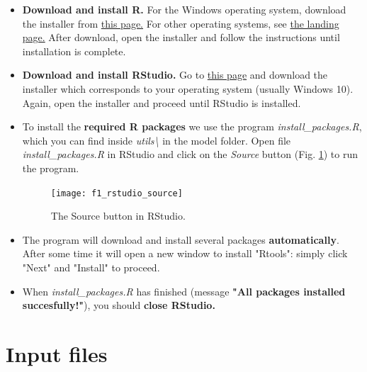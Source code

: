 \documentclass[15pt]{extarticle}
\begin{document}
\begin{itemize}
    \item \textbf{Download and install R.} For the Windows operating system, download the installer from \href{https://cran.rstudio.com/bin/windows/base/}{this page.} For other operating systems, see \href{https://cran.rstudio.com/}{the landing page.} After download, open the installer and follow the instructions until installation is complete.
    \item \textbf{Download and install RStudio.} Go to \href{https://www.rstudio.com/products/rstudio/download/#download}{this page} and download the installer which corresponds to your operating system (usually Windows 10). Again, open the installer and proceed until RStudio is installed.
    \item To install the \textbf{required R packages} we use the program \textit{install\_packages.R}, which you can find inside \textit{utils\textbackslash} in the model folder. Open file \textit{install\_packages.R} in RStudio and click on the \textit{Source} button (Fig. \ref{fig:f1_rstudio_source}) to run the program.
    
\begin{figure}[h]
    \centering
    \texttt{[image: f1\_rstudio\_source]}
    \caption{The Source button in RStudio.}
    \label{fig:f1_rstudio_source}
\end{figure}
    
    \item The program will download and install several packages \textbf{automatically}. After some time it will open a new window to install "Rtools": simply click "Next" and "Install" to proceed.
    \item When \textit{install\_packages.R} has finished (message \textbf{"All packages installed succesfully!"}), you should \textbf{close RStudio.}
\end{itemize}


\clearpage
\section{Input files}
\end{document}
